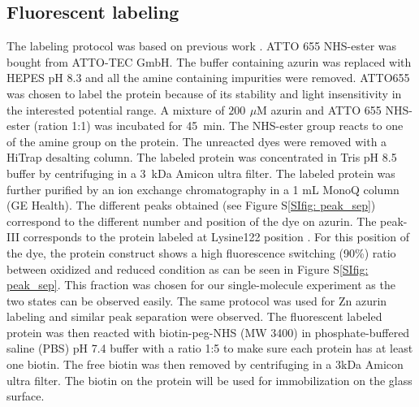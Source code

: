 \documentclass[journal=jacsat,manuscript=article]{achemso}
\newcommand{\uM}{\ensuremath{\,\mu\textrm{M}}}
\begin{document}
\subsection{Fluorescent labeling}
The labeling protocol was based on previous work \cite{nicolardi2012topdown}. ATTO 655 NHS-ester was bought from ATTO-TEC GmbH. The buffer containing azurin was replaced with HEPES pH 8.3 and all the amine containing impurities were removed. ATTO655 was chosen to label the protein because of its stability and light insensitivity in the interested potential range. A mixture of $200~\uM$ azurin and ATTO 655 NHS-ester (ration 1:1) was incubated for 45~min. The NHS-ester group reacts to one of the amine group on the protein. The unreacted dyes were removed with a HiTrap desalting column. The labeled protein was concentrated in Tris pH 8.5 buffer by centrifuging in a 3~kDa Amicon ultra filter. The labeled protein was further purified by an ion exchange chromatography in a 1 mL MonoQ column (GE Health). The different peaks obtained (see Figure S\ref{SIfig: peak_sep}) correspond to the different number and position of the dye on azurin. The peak-III corresponds to the protein labeled at Lysine122 position \cite{nicolardi2012topdown}. For this position of the dye, the protein construct shows a high fluorescence switching (90\%) ratio between oxidized and reduced condition as can be seen in Figure S\ref{SIfig: peak_sep}. This fraction was chosen for our single-molecule experiment as the two states can be observed easily. The same protocol was used for Zn azurin labeling and similar peak separation were observed. The fluorescent labeled protein was then reacted with biotin-peg-NHS (MW 3400) in phosphate-buffered saline (PBS) pH 7.4 buffer with a ratio 1:5 to make sure each protein has at least one biotin. The free biotin was then removed by centrifuging in a 3kDa Amicon ultra filter. The biotin on the protein will be used for immobilization on the glass surface.
\end{document}
